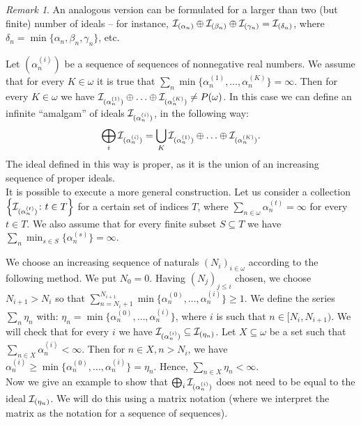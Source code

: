 \documentclass[12pt]{article}
\theoremstyle{plain}
\theoremstyle{definition}
\theoremstyle{remark}
\newtheorem*{remark}{Remark}
\newcommand{\cI}{{\cal I}}
\begin{document}
\begin{remark}
An analogous version can be formulated for a larger than two (but finite) number of ideals -- for instance, $\cI_{(\alpha_n)} \oplus \cI_{(\beta_n)} \oplus \cI_{(\gamma_n)} = \cI_{(\delta_n)}$, where $\delta_n = \min\{\alpha_n,\beta_n, \gamma_n\}$, etc.
\end{remark}

Let $(\alpha_n^{(i)})$ be a sequence of sequences of nonnegative real numbers. We assume that for every $K \in \omega$ it is true that $\sum_n \min \{\alpha_n^{(1)}, \ldots, \alpha_n^{(K)}\} = \infty$. Then for every $K \in \omega$ we have
$\cI_{(\alpha_n^{(1)})} \oplus\ldots\oplus \cI_{(\alpha_n^{(K)})} \not= P(\omega)$.
In this case we can define an infinite ``amalgam'' of ideals $\cI_{(\alpha_n^{(i)})}$, in the following way:			 
$$\bigoplus_{i}\cI_{(\alpha_n^{(i)})} = \bigcup_{K} \cI_{(\alpha_n^{(1)})} \oplus\ldots\oplus \cI_{(\alpha_n^{(K)})}.$$
The ideal defined in this way is proper, as it is the union of an increasing sequence of proper ideals.\\


It is possible to execute a more general construction. Let us consider a collection $\left\{ \cI_{(\alpha_n^{(t)})} \colon t \in T \right\} $ for a certain set of indices $T$, where $\sum_{n\in\omega}\alpha_n^{(t)} = \infty$ for every $t\in T$. We also assume that for every finite subset $S \subseteq T$ we have $\sum_n \min_{s\in S} \{\alpha_n^{(s)}\} = \infty$.

We choose an increasing sequence of naturals $(N_i)_{i\in\omega}$ according to the following method. We put $N_0 = 0$. Having $(N_j)_{j \leq i}$ chosen, we choose $N_{i + 1} > N_{i}$ so that $\sum_{n = N_{i} + 1}^{N_{i+1}} \min\{\alpha_n^{(0)} , \ldots, \alpha_n^{(i)} \} \geq 1$. We define the series $\sum_n \eta_n$ with: $\eta_n = \min\{\alpha_n^{(0)} , \ldots, \alpha_n^{(i)}\}$, where $i$ is such that $n \in [N_i, N_{i+1})$. We will check that for every $i$ we have $\cI_{(\alpha_n^{(i)})} \subseteq \cI_{(\eta_n)}$. Let $X \subseteq \omega$ be a set such that $\sum_{n\in X} \alpha_n^{(i)} < \infty$. Then for $n\in X, n > N_i$, we have $\alpha_n^{(i)} \geq \min\{\alpha_n^{(0)} , \ldots, \alpha_n^{(i)}\} = \eta_n$. Hence, $\sum_{n\in X}\eta_n < \infty$.\\


Now we give an example to show that $\bigoplus_{i}\cI_{(\alpha_n^{(i)})}$ does not need to be equal to the ideal $\cI_{(\eta_n)}$. We will do this using a matrix notation (where we interpret the matrix as the notation for a sequence of sequences).
\end{document}

